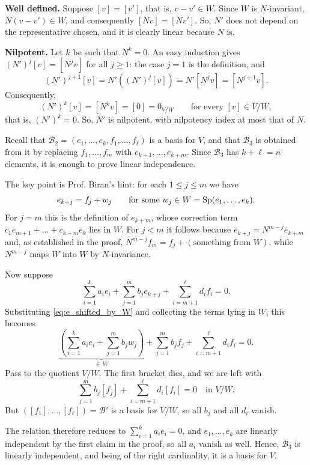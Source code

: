 \begin{exercisesolution}
\label{sol:induced_map_nilpotent}
\textbf{Well defined.} Suppose $[v] = [v']$, that is, $v - v' \in W$. Since $W$ is $N$-invariant, $N(v - v') \in W$, and consequently $[Nv] = [Nv']$. So, $N'$ does not depend on the representative chosen, and it is clearly linear because $N$ is.

\textbf{Nilpotent.} Let $k$ be such that $N^k = 0$. An easy induction gives $(N')^j [v] = [N^j v]$ for all $j \ge 1$: the case $j = 1$ is the definition, and
\[
    (N')^{j+1}[v] = N'\left((N')^j [v]\right) = N'\left[N^j v\right] = \left[N^{j+1} v\right].
\]
Consequently,
\[
    (N')^k [v] = \left[N^k v\right] = [0] = 0_{V/W} \qquad \text{for every } [v] \in V/W,
\]
that is, $(N')^k = 0$. So, $N'$ is nilpotent, with nilpotency index at most that of $N$.
\end{exercisesolution}

\begin{exercisesolution}
\label{sol:B3_is_a_basis}
Recall that $\mathcal{B}_2 = (e_1, \dots, e_k, f_1, \dots, f_\ell)$ is a basis for $V$, and that $\mathcal{B}_3$ is obtained from it by replacing $f_1, \dots, f_m$ with $e_{k+1}, \dots, e_{k+m}$. Since $\mathcal{B}_3$ has $k + \ell = n$ elements, it is enough to prove linear independence.

The key point is Prof. Biran's hint: for each $1 \le j \le m$ we have
\begin{equation}
\label{eq:e_shifted_by_W}
    e_{k+j} = f_j + w_j \qquad \text{for some } w_j \in W = \operatorname{Sp}(e_1, \dots, e_k).
\end{equation}
For $j = m$ this is the definition of $e_{k+m}$, whose correction term $c_1 e_{m+1} + \dots + c_{k-m} e_k$ lies in $W$. For $j < m$ it follows because $e_{k+j} = N^{m-j} e_{k+m}$ and, as established in the proof, $N^{m-j} f_m = f_j + (\text{something from } W)$, while $N^{m-j}$ maps $W$ into $W$ by $N$-invariance.

Now suppose
\[
    \sum_{i=1}^{k} a_i e_i + \sum_{j=1}^{m} b_j e_{k+j} + \sum_{i=m+1}^{\ell} d_i f_i = 0.
\]
Substituting \eqref{eq:e_shifted_by_W} and collecting the terms lying in $W$, this becomes
\[
    \underbrace{\left(\sum_{i=1}^{k} a_i e_i + \sum_{j=1}^{m} b_j w_j\right)}_{\in \, W} + \sum_{j=1}^{m} b_j f_j + \sum_{i=m+1}^{\ell} d_i f_i = 0.
\]
Pass to the quotient $V/W$. The first bracket dies, and we are left with
\[
    \sum_{j=1}^{m} b_j [f_j] + \sum_{i=m+1}^{\ell} d_i [f_i] = 0 \quad \text{in } V/W.
\]
But $([f_1], \dots, [f_\ell]) = \mathcal{B}'$ is a basis for $V/W$, so all $b_j$ and all $d_i$ vanish.

The relation therefore reduces to $\sum_{i=1}^{k} a_i e_i = 0$, and $e_1, \dots, e_k$ are linearly independent by the first claim in the proof, so all $a_i$ vanish as well. Hence, $\mathcal{B}_3$ is linearly independent, and being of the right cardinality, it is a basis for $V$.
\end{exercisesolution}

